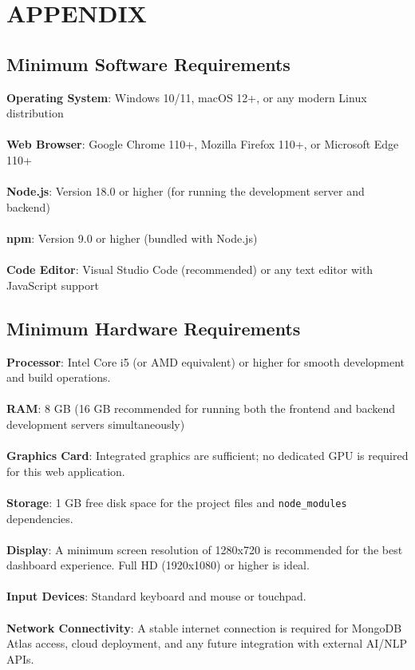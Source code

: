 \chapter{APPENDIX}

\section{Minimum Software Requirements}
\medskip
\textbf{Operating System}: Windows 10/11, macOS 12+, or any modern Linux distribution
\\\\
\textbf{Web Browser}: Google Chrome 110+, Mozilla Firefox 110+, or Microsoft Edge 110+
\\\\
\textbf{Node.js}: Version 18.0 or higher (for running the development server and backend)
\\\\
\textbf{npm}: Version 9.0 or higher (bundled with Node.js)
\\\\
\textbf{Code Editor}: Visual Studio Code (recommended) or any text editor with JavaScript support

\section{Minimum Hardware Requirements}
\textbf{Processor}:  Intel Core i5 (or AMD equivalent) or higher for smooth development and build operations.
\\\\
\textbf{RAM}: 8 GB (16 GB recommended for running both the frontend and backend development servers simultaneously)
\\\\
\textbf{Graphics Card}: Integrated graphics are sufficient; no dedicated GPU is required for this web application.
\\\\
\textbf{Storage}: 1 GB free disk space for the project files and \texttt{node\_modules} dependencies.
\\\\
\textbf{Display}: A minimum screen resolution of 1280x720 is recommended for the best dashboard experience. Full HD (1920x1080) or higher is ideal.
\\\\
\textbf{Input Devices}: Standard keyboard and mouse or touchpad.
\\\\
\textbf{Network Connectivity}: A stable internet connection is required for MongoDB Atlas access, cloud deployment, and any future integration with external AI/NLP APIs.
\\\\